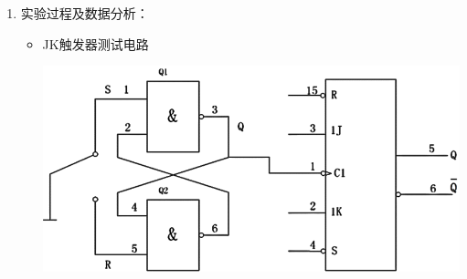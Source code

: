 \documentclass[UTF8]{ctexart}
\begin{document}
\begin{enumerate}
      \item  实验过程及数据分析：  \\
            \begin{itemize}
                  \item JK触发器测试电路  
                        \begin{center}
                              \includegraphics[scale = 0.6]{6.png}
                              \label{fig:label}
                        \end{center}


\end{itemize}
\end{enumerate}
\end{document}
